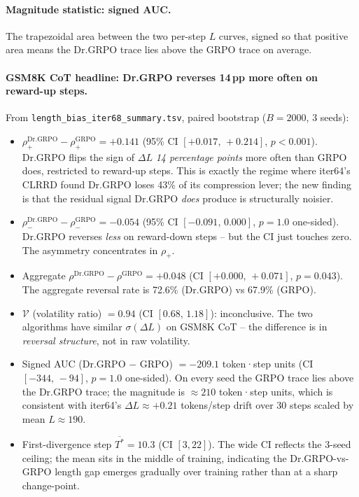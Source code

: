 \paragraph{Magnitude statistic: signed AUC.}
The trapezoidal area between the two per-step $L$ curves, signed so that
positive area means the Dr.GRPO trace lies above the GRPO trace on
average.

\paragraph{GSM8K CoT headline: Dr.GRPO reverses 14\,pp more often on reward-up steps.}
From \texttt{length\_bias\_iter68\_summary.tsv}, paired bootstrap
($B=2000$, $3$ seeds):
\begin{itemize}
\item $\rho_{+}^{\mathrm{Dr.GRPO}} - \rho_{+}^{\mathrm{GRPO}} = +0.141$
      (95\% CI $[+0.017,\,+0.214]$, $p < 0.001$). Dr.GRPO flips the
      sign of $\Delta L$ \emph{14 percentage points} more often than
      GRPO does, restricted to reward-up steps. This is exactly the
      regime where iter64's CLRRD found Dr.GRPO loses 43\% of its
      compression lever; the new finding is that the residual signal
      Dr.GRPO \emph{does} produce is structurally noisier.
\item $\rho_{-}^{\mathrm{Dr.GRPO}} - \rho_{-}^{\mathrm{GRPO}} = -0.054$
      (95\% CI $[-0.091,\, 0.000]$, $p = 1.0$ one-sided). Dr.GRPO
      reverses \emph{less} on reward-down steps -- but the CI just
      touches zero. The asymmetry concentrates in $\rho_{+}$.
\item Aggregate $\rho^{\mathrm{Dr.GRPO}} - \rho^{\mathrm{GRPO}} = +0.048$
      (CI $[+0.000,\, +0.071]$, $p = 0.043$). The aggregate reversal
      rate is 72.6\% (Dr.GRPO) vs 67.9\% (GRPO).
\item $\mathcal{V}$ (volatility ratio) $= 0.94$ (CI $[0.68,\, 1.18]$):
      inconclusive. The two algorithms have similar $\sigma(\Delta L)$
      on GSM8K CoT -- the difference is in \emph{reversal structure},
      not in raw volatility.
\item Signed AUC (Dr.GRPO $-$ GRPO) $= -209.1$ token·step units
      (CI $[-344,\, -94]$, $p = 1.0$ one-sided). On every seed the
      GRPO trace lies above the Dr.GRPO trace; the magnitude is
      $\approx 210$ token·step units, which is consistent with
      iter64's $\Delta L \approx +0.21$ tokens/step drift over 30
      steps scaled by mean $L \approx 190$.
\item First-divergence step $\overline{T^*} = 10.3$ (CI $[3, 22]$).
      The wide CI reflects the 3-seed ceiling; the mean sits in the
      middle of training, indicating the Dr.GRPO-vs-GRPO length gap
      emerges gradually over training rather than at a sharp
      change-point.
\end{itemize}

